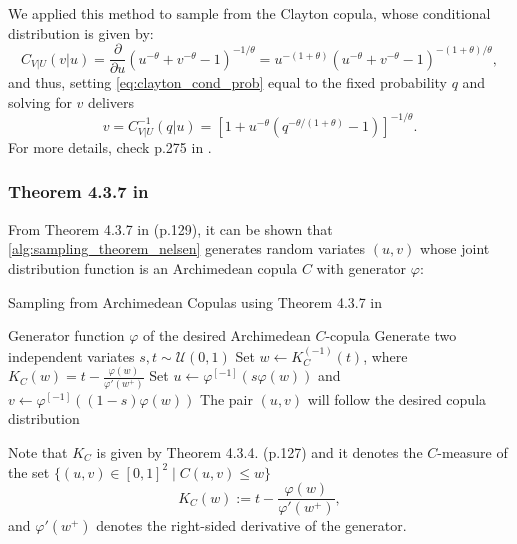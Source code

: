 \documentclass[12pt,a4paper]{article}
\begin{document}
We applied this method to sample from the Clayton copula, whose conditional distribution is given by:
\begin{equation}\label{eq:clayton_cond_prob}
	C_{V|U}(v|u)= \frac{\partial}{\partial u} (u^{-\theta}+v^{-\theta} - 1)^{-1/\theta} = u^{-(1+\theta)}(u^{-\theta}+v^{-\theta} - 1)^{-(1+\theta)/\theta},
\end{equation}
and thus, setting \eqref{eq:clayton_cond_prob} equal to the fixed probability $q$ and solving for $v$ delivers%
$$v = C_{V|U}^{-1} (q|u)= \left[1+u^{-\theta}(q^{-\theta/(1+\theta)} - 1)\right]^{-1/\theta}.$$
For more details, check p.275 in \cite{alexander2008market}.


\subsubsection{Theorem 4.3.7 in \cite{Nelsen2006}}
From Theorem 4.3.7 in \cite{Nelsen2006} (p.129), it can be shown that \cref{alg:sampling_theorem_nelsen} generates random variates $(u,v)$ whose joint distribution function is an Archimedean copula $C$ with generator $\varphi$: %

\begin{algorithm}[H]
\caption{Sampling from Archimedean Copulas using Theorem 4.3.7 in \cite{Nelsen2006}}
\label{alg:sampling_theorem_nelsen}
\begin{algorithmic}[1]
\Require Generator function $\varphi$ of the desired Archimedean $C$-copula
\State Generate two independent variates $s,t\sim\mathcal U(0,1)$
\State Set $w \gets K_C^{(-1)}(t)$, where 
$\displaystyle K_C(w) = t - \frac{\varphi(w)}{\varphi'(w^+)}$
\State Set $u \gets \varphi^{[-1]}(s\varphi(w))$ and $v \gets \varphi^{[-1]}((1-s)\varphi(w))$
\Ensure The pair $(u,v)$ will follow the desired copula distribution
\end{algorithmic}
\end{algorithm}
Note that $K_C$ is given by Theorem 4.3.4. (p.127) and it denotes the $C$-measure of the set $\{(u,v)\in [0,1]^2 \mid C(u,v)\leq w\}$
$$
K_C(w) := t - \frac{\varphi(w)}{\varphi'(w^+)},
$$ 
and ${\varphi'(w^+)}$ denotes the right-sided derivative of the generator.
\end{document}
